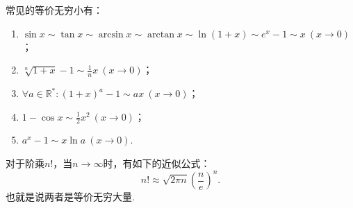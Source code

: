 常见的等价无穷小有：
\begin{enumerate}
	\item \(\sin x \sim \tan x \sim \arcsin x \sim \arctan x \sim \ln(1+x) \sim e^x-1 \sim x\ (x\to0)\)；
	\item \(\sqrt[n]{1+x} - 1 \sim \frac{1}{n} x\ (x\to0)\)；
	\item \(\forall a\in\mathbb{R}^*: (1+x)^a-1 \sim ax\ (x\to0)\)；
	\item \(1 - \cos x \sim \frac{1}{2} x^2\ (x\to0)\)；
	\item \(a^x - 1 \sim x \ln a\ (x\to0)\).
\end{enumerate}

\begin{theorem}[斯特林公式]\label{theorem:极限.斯特林公式}
对于阶乘\(n!\)，当\(n\to\infty\)时，有如下的近似公式：\[
n! \approx \sqrt{2 \pi n} \left( \frac{n}{e} \right)^n.
\]也就是说两者是等价无穷大量.
\end{theorem}

